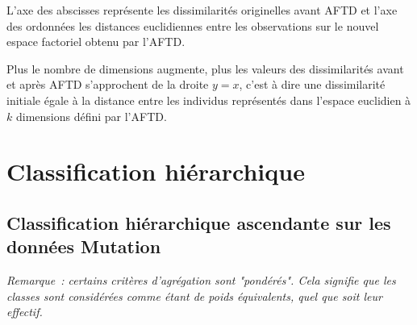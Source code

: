 \documentclass[a4paper,10pt]{report}
\begin{document}
L'axe des abscisses représente les dissimilarités originelles avant AFTD et l'axe des ordonnées les distances euclidiennes entre les observations sur le nouvel espace factoriel obtenu par l'AFTD.

Plus le nombre de dimensions augmente, plus les valeurs des dissimilarités avant et après AFTD s'approchent de la droite $y = x$, c'est à dire une dissimilarité initiale égale à la distance entre les individus représentés dans l'espace euclidien à $k$ dimensions défini par l'AFTD.







\chapter{Classification hiérarchique}

\section{Classification hiérarchique ascendante sur les données Mutation}

\textit{Remarque~: certains critères d'agrégation sont "pondérés". Cela signifie que les classes sont considérées comme étant de poids équivalents, quel que soit leur effectif.}
\end{document}
